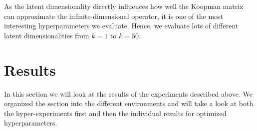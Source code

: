 			As the latent dimensionality directly influences how well the Koopman matrix can approximate the infinite-dimensional operator, it is one of the most interesting hyperparameters we evaluate. Hence, we evaluate lots of different latent dimensionalities from \( k = 1 \) to \( k = 50 \).

\section{Results}
	\label{sec:results}

	In this section we will look at the results of the experiments described above. We organized the section into the different environments and will take a look at both the hyper-experiments first and then the individual results for optimized hyperparameters.

